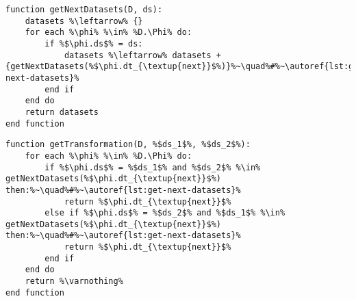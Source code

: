 \vfill{}

\begin{minipage}[c]{0.95\textwidth}
\begin{lstlisting}[language=pseudocode,label={lst:get-next-datasets-2},caption={[Obtenção dos próximos conjuntos de dados de um conjunto de dados]Obtenção dos próximos conjuntos de dados de um conjunto de dados.}]
function getNextDatasets(D, ds):
    datasets %\leftarrow% {}
    for each %\phi% %\in% %D.\Phi% do:
        if %$\phi.ds$% = ds:
            datasets %\leftarrow% datasets + {getNextDatasets(%$\phi.dt_{\textup{next}}$%)}%~\quad%#%~\autoref{lst:get-next-datasets}%
        end if
    end do
    return datasets
end function
\end{lstlisting}
\end{minipage}

\vfill{}

\begin{minipage}[c]{0.95\textwidth}
\begin{lstlisting}[language=pseudocode,label={lst:get-transformation},caption={[Obtenção da transformação entre dois conjuntos de dados]Obtenção da transformação de dados associada a dois conjuntos de dados.}]
function getTransformation(D, %$ds_1$%, %$ds_2$%):
    for each %\phi% %\in% %D.\Phi% do:
        if %$\phi.ds$% = %$ds_1$% and %$ds_2$% %\in% getNextDatasets(%$\phi.dt_{\textup{next}}$%) then:%~\quad%#%~\autoref{lst:get-next-datasets}%
            return %$\phi.dt_{\textup{next}}$%
        else if %$\phi.ds$% = %$ds_2$% and %$ds_1$% %\in% getNextDatasets(%$\phi.dt_{\textup{next}}$%) then:%~\quad%#%~\autoref{lst:get-next-datasets}%
            return %$\phi.dt_{\textup{next}}$%
        end if
    end do
    return %\varnothing%
end function
\end{lstlisting}
\end{minipage}